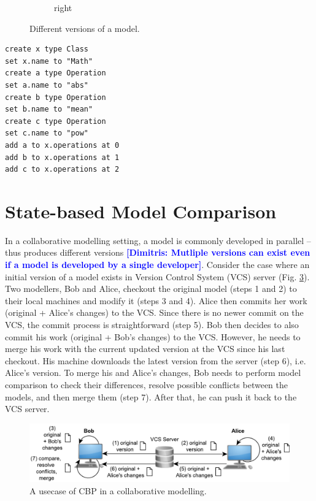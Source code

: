 \documentclass{jot}
\newcommand{\dk}[1]{\textcolor{blue}{\textbf{[Dimitris: #1]}}}
\begin{document}
\begin{minipage}[t]{0.61\linewidth}
\begin{figure}[H]
\begin{subfigure}[t]{0.2\linewidth}
        \caption{right}
        \label{fig:right}
    \end{subfigure}
    \hfill
    \label{fig:versions}
    \caption{Different versions of a model.}
\end{figure}
\end{minipage}
\hfill
\begin{minipage}[t]{0.37\linewidth}
\begin{lstlisting}[style=eol,numbersep=0.6pt,caption={The pseudo-formatted CBP of the model in Fig. \ref{fig:origin}.},label=lst:origincbp]
create x type Class
set x.name to "Math" 
create a type Operation
set a.name to "abs" 
create b type Operation
set b.name to "mean" 
create c type Operation
set c.name to "pow" 
add a to x.operations at 0
add b to x.operations at 1
add c to x.operations at 2
\end{lstlisting}
\end{minipage}

\vspace{-5pt}
\section{State-based Model Comparison}
\label{sec:model_comparison}

\vspace{-5pt}
In a collaborative modelling setting, a model is commonly developed in parallel -- thus produces different versions \dk{Mutliple versions can exist even if a model is developed by a single developer}.
Consider the case where an initial version of a model exists in Version Control System (VCS) server (Fig. \ref{fig:vcs}).
Two modellers, Bob and Alice, checkout the original model (steps 1 and 2) to their local machines and modify it (steps 3 and 4).
Alice then commits her work (original + Alice's changes) to the VCS.
Since there is no newer commit on the VCS, the commit process is straightforward (step 5).
Bob then decides to also commit his work (original + Bob's changes) to the VCS.
However, he needs to merge his work with the current updated version at the VCS since his last checkout.
His machine downloads the latest version from the server (step 6), i.e. Alice's version.
To merge his and Alice's changes, Bob needs to perform model comparison to check their differences, resolve possible conflicts between the models, and then merge them (step 7).
After that, he can push it back to the VCS server.

\begin{figure}[ht]
    \includegraphics[width=\linewidth]{VCS}
    \caption{A usecase of CBP in a collaborative modelling.}
    \label{fig:vcs}
\end{figure}
\end{document}
